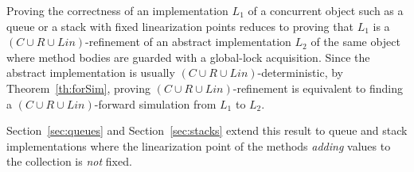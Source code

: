 Proving the correctness of an implementation $L_1$ of a concurrent object such as a queue or a stack with fixed linearization points
reduces to proving that $L_1$ is a $(C\cup R\cup Lin)$-refinement of an abstract implementation $L_2$ of the same object where method
bodies are guarded with a global-lock acquisition. Since the abstract implementation is usually $(C\cup R\cup Lin)$-deterministic,
by Theorem~\ref{th:forSim}, proving $(C\cup R\cup Lin)$-refinement is equivalent to finding a $(C\cup R\cup Lin)$-forward simulation 
from $L_1$ to $L_2$.

Section~\ref{sec:queues} and Section~\ref{sec:stacks} extend this result to queue and stack implementations where the linearization point of the methods 
\emph{adding} values to the collection is \emph{not} fixed.
